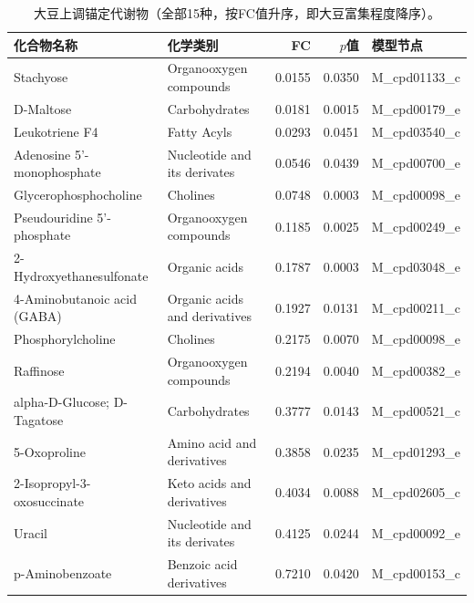 \documentclass[10pt, a4paper, twocolumn]{ctexart}
\begin{document}
\begin{table}[htbp]
\caption{大豆上调锚定代谢物（全部15种，按FC值升序，即大豆富集程度降序）。}
\label{tab:soy_up}
\small
\begin{tabularx}{\textwidth}{lXrrl}
\toprule
\textbf{化合物名称} & \textbf{化学类别} & \textbf{FC} & \textbf{$p$值} & \textbf{模型节点} \\
\midrule
Stachyose                     & Organooxygen compounds           & 0.0155 & 0.0350 & M\_cpd01133\_c \\
D-Maltose                     & Carbohydrates                    & 0.0181 & 0.0015 & M\_cpd00179\_e \\
Leukotriene F4                & Fatty Acyls                      & 0.0293 & 0.0451 & M\_cpd03540\_c \\
Adenosine 5'-monophosphate    & Nucleotide and its derivates     & 0.0546 & 0.0439 & M\_cpd00700\_e \\
Glycerophosphocholine         & Cholines                         & 0.0748 & 0.0003 & M\_cpd00098\_e \\
Pseudouridine 5'-phosphate    & Organooxygen compounds           & 0.1185 & 0.0025 & M\_cpd00249\_e \\
2-Hydroxyethanesulfonate      & Organic acids                    & 0.1787 & 0.0003 & M\_cpd03048\_e \\
4-Aminobutanoic acid (GABA)   & Organic acids and derivatives    & 0.1927 & 0.0131 & M\_cpd00211\_c \\
Phosphorylcholine             & Cholines                         & 0.2175 & 0.0070 & M\_cpd00098\_e \\
Raffinose                     & Organooxygen compounds           & 0.2194 & 0.0040 & M\_cpd00382\_e \\
alpha-D-Glucose; D-Tagatose   & Carbohydrates                    & 0.3777 & 0.0143 & M\_cpd00521\_c \\
5-Oxoproline                  & Amino acid and derivatives       & 0.3858 & 0.0235 & M\_cpd01293\_e \\
2-Isopropyl-3-oxosuccinate    & Keto acids and derivatives       & 0.4034 & 0.0088 & M\_cpd02605\_c \\
Uracil                        & Nucleotide and its derivates     & 0.4125 & 0.0244 & M\_cpd00092\_e \\
p-Aminobenzoate               & Benzoic acid derivatives         & 0.7210 & 0.0420 & M\_cpd00153\_c \\
\bottomrule
\end{tabularx}
\end{table}
\end{document}
